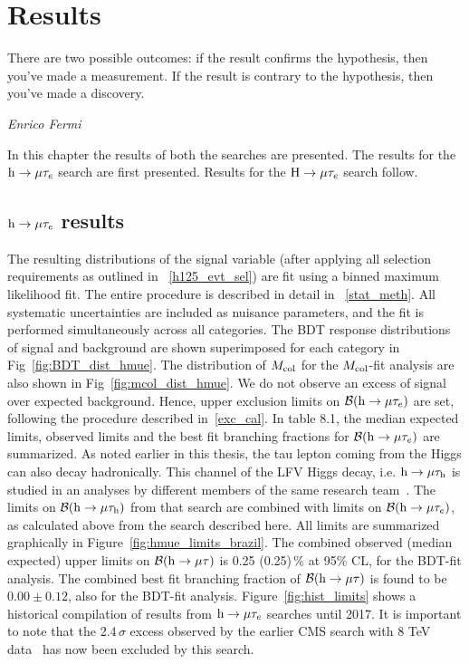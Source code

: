 
%
%

\chapter{Results}
\epigraph{There are two possible outcomes: if the result confirms the hypothesis, then you've made a measurement. If the result is contrary to the hypothesis, then you've made a discovery.}{\textit{Enrico Fermi}}
\label{results}
\vskip 0.6in
In this chapter the results of both the searches are presented. The results for the $\text{h} \to \mu \tau_{e}$ search are first presented. Results for the $\text{H} \to \mu \tau_{e}$ search follow.

\section{$\text{h} \to \mu \tau_{e}$ results}
The resulting distributions of the signal variable (after applying all selection requirements as outlined in ~\ref{h125_evt_sel}) are fit using a binned maximum likelihood fit. The entire procedure is described in detail in ~\ref{stat_meth}. All systematic uncertainties are included as nuisance parameters, and the fit is performed simultaneously across all categories. The BDT response distributions of signal and background are shown superimposed for each category in Fig~\ref{fig:BDT_dist_hmue}. The distribution of $M_{\text{col}}$ for the $M_{\text{col}}$-fit analysis are also shown in Fig~\ref{fig:mcol_dist_hmue}. We do not observe an excess of signal over expected background. Hence, upper exclusion limits on $\mathcal{B}(\text{h} \to \mu \tau_{e})$ are set, following the procedure described in~\ref{exc_cal}. In table 8.1, the median expected limits, observed limits and the best fit branching fractions for $\mathcal{B}(\text{h} \to \mu \tau_{e})$ are summarized. As noted earlier in this thesis, the tau lepton coming from the Higgs can also decay hadronically. This channel of the LFV Higgs decay, i.e. $\text{h} \to \mu \tau_{\text{h}}$ is studied in an analyses by different members of the same research team~\cite{HIG-17-001}. The limits on $\mathcal{B}(\text{h} \to \mu \tau_{\text{h}})$ from that search are combined with limits on $\mathcal{B}(\text{h} \to \mu \tau_{e})$, as calculated above from the search described here. All limits are summarized graphically in Figure~\ref{fig:hmue_limits_brazil}. The combined observed (median expected) upper limits on $\mathcal{B}(\text{h} \to \mu \tau)$ is 0.25 (0.25)\,\% at 95\% CL, for the BDT-fit analysis. The combined best fit branching fraction of $\mathcal{B}(\text{h} \to \mu \tau)$ is found to be $0.00 \pm 0.12$, also for the BDT-fit analysis. Figure~\ref{fig:hist_limits} shows a historical compilation of results from $\text{h} \to \mu \tau_{e}$ searches until 2017. It is important to note that the 2.4\,$\sigma$ excess observed by the earlier CMS search with 8 TeV data~\cite{Khachatryan:2015kon} has now been excluded by this search.


